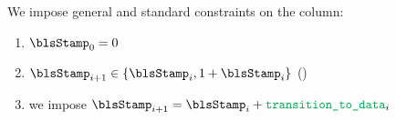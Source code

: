 We impose general and standard constraints on the \blsStamp{} column:
\begin{enumerate}
	\item $\blsStamp_{0} = 0$
	\item $\blsStamp_{i + 1} \in \{ \blsStamp_{i}, 1 + \blsStamp_{i} \}$ \quad (\trash)
	\item we impose $ \blsStamp_{i + 1} = \blsStamp_{i} + \locTransitionToData _{i} $
\end{enumerate}
